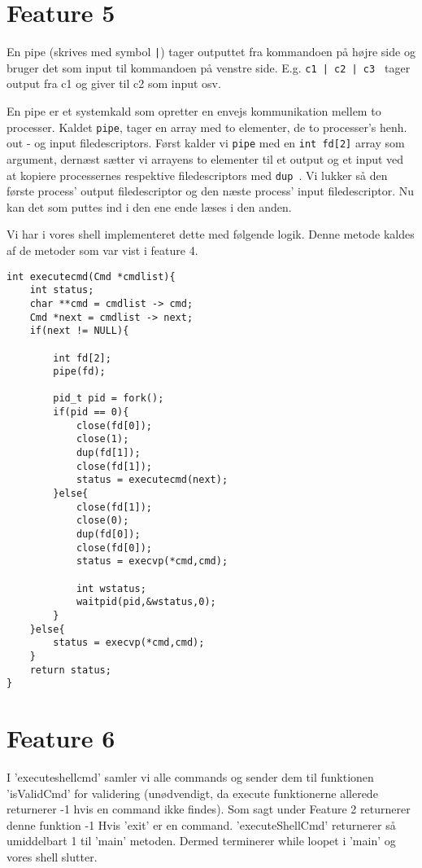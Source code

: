\documentclass[danish]{report}
\begin{document}
\section{Feature 5}

En pipe (skrives med symbol {\tt |}) tager outputtet fra kommandoen på højre side og bruger det som input til kommandoen på venstre side. E.g. {\tt c1 | c2 | c3 } tager output fra c1 og giver til c2 som input osv. 

En pipe er et systemkald som opretter en envejs kommunikation mellem to processer. Kaldet {\tt pipe}, tager en array med to elementer, de to processer's henh. out - og input filedescriptors. Først kalder vi {\tt pipe} med en {\tt int fd[2]} array som argument, dernæst sætter vi arrayens to elementer til et output og et input ved at kopiere processernes respektive filedescriptors med {\tt dup }. Vi lukker så den første process' output filedescriptor og den næste process' input filedescriptor. Nu kan det som puttes ind i den ene ende læses i den anden.  

Vi har i vores shell implementeret dette med følgende logik. Denne metode kaldes af de metoder som var vist i feature 4.

\begin{lstlisting}
int executecmd(Cmd *cmdlist){
    int status;
    char **cmd = cmdlist -> cmd;
    Cmd *next = cmdlist -> next;
    if(next != NULL){

        int fd[2];
        pipe(fd);

        pid_t pid = fork();
        if(pid == 0){
            close(fd[0]);
            close(1);
            dup(fd[1]);
            close(fd[1]);
            status = executecmd(next);
        }else{
            close(fd[1]);
            close(0);
            dup(fd[0]);
            close(fd[0]);
            status = execvp(*cmd,cmd);
            
            int wstatus;
            waitpid(pid,&wstatus,0);
        }
    }else{
        status = execvp(*cmd,cmd);
    }
    return status;
}

\end{lstlisting}

\section{Feature 6}


I 'executeshellcmd' samler vi alle commands og sender dem til funktionen 'isValidCmd' for validering (unødvendigt, da execute funktionerne allerede returnerer -1 hvis en command ikke findes). Som sagt under Feature 2 returnerer denne funktion -1 Hvis 'exit' er en command. 'executeShellCmd' returnerer så umiddelbart 1 til 'main' metoden. Dermed terminerer while loopet i 'main' og vores shell slutter. 
\end{document}
